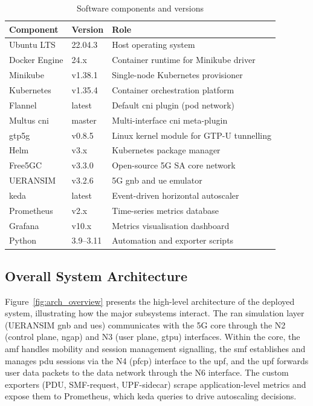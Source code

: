 \begin{table}[H]
  \centering
  \caption{Software components and versions}
  \label{tab:software}
  \begin{tabularx}{\linewidth}{llX}
    \toprule
    \textbf{Component} & \textbf{Version} & \textbf{Role} \\
    \midrule
    Ubuntu LTS       & 22.04.3  & Host operating system \\
    Docker Engine    & 24.x     & Container runtime for Minikube driver \\
    Minikube         & v1.38.1  & Single-node Kubernetes provisioner \\
    Kubernetes       & v1.35.4  & Container orchestration platform \\
    Flannel          & latest   & Default \gls{cni} plugin (pod network) \\
    Multus \gls{cni} & master   & Multi-interface \gls{cni} meta-plugin \\
    gtp5g            & v0.8.5   & Linux kernel module for GTP-U tunnelling \\
    Helm             & v3.x     & Kubernetes package manager \\
    Free5GC          & v3.3.0   & Open-source 5G SA core network \\
    UERANSIM         & v3.2.6   & 5G \gls{gnb} and \gls{ue} emulator \\
    \gls{keda}       & latest   & Event-driven horizontal autoscaler \\
    Prometheus       & v2.x     & Time-series metrics database \\
    Grafana          & v10.x    & Metrics visualisation dashboard \\
    Python           & 3.9–3.11 & Automation and exporter scripts \\
    \bottomrule
  \end{tabularx}
\end{table}

\subsection{Overall System Architecture}

Figure~\ref{fig:arch_overview} presents the high-level architecture of the deployed system, illustrating how the major subsystems interact. The \gls{ran} simulation layer (UERANSIM \gls{gnb} and \glspl{ue}) communicates with the 5G core through the N2 (control plane, \gls{ngap}) and N3 (user plane, \gls{gtpu}) interfaces. Within the core, the \gls{amf} handles mobility and session management signalling, the \gls{smf} establishes and manages \gls{pdu} sessions via the N4 (\gls{pfcp}) interface to the \gls{upf}, and the \gls{upf} forwards user data packets to the data network through the N6 interface. The custom exporters (PDU, SMF-request, UPF-sidecar) scrape application-level metrics and expose them to Prometheus, which \gls{keda} queries to drive autoscaling decisions.

